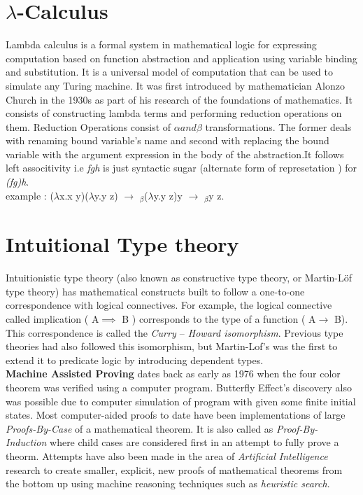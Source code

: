 \section{$\lambda$-Calculus}

Lambda calculus is a formal system in mathematical logic for expressing computation based on function abstraction and application using variable binding and substitution. It is a universal model of computation that can be used to simulate any Turing machine. It was first introduced by mathematician Alonzo Church in the 1930s as part of his research of the foundations of mathematics. It consists of constructing lambda terms and performing reduction operations on them. Reduction Operations consist of $\alpha and \beta $ transformations. The former deals with renaming bound variable's name and second with replacing the bound variable with the argument expression in the body of the abstraction.It follows left associtivity i.e \textit{fgh} is just syntactic sugar (alternate form of represetation ) for \textit{(fg)h}.\\

example : ($\lambda$x.x y)($\lambda$y.y z) $\longrightarrow$ {}$_\beta$($\lambda$y.y z)y $\longrightarrow$ {}$_\beta$y z.

\section{Intuitional Type theory} 

Intuitionistic type theory (also known as constructive type theory, or Martin-Löf type theory) has mathematical constructs  built to follow a one-to-one correspondence with logical connectives. For example, the logical connective called implication ( { A$\implies$ B} ) corresponds to the type of a function ( { A$\to$ B}). This correspondence is called the \textit{Curry $–$ Howard isomorphism}. Previous type theories had also followed this isomorphism, but Martin-Lof's was the first to extend it to predicate logic by introducing dependent types.\\

\hfill \break \textbf{Machine Assisted Proving} dates back as early as 1976 when the four color theorem was verified using a computer program. Butterfly Effect's discovery also was possible due to computer simulation of program with given some finite initial states. Most computer-aided proofs to date have been implementations of large \textit{Proofs-By-Case} of a mathematical theorem. It is also called as \textit{Proof-By-Induction}  where child cases are considered first in an attempt to fully prove a theorm. Attempts have also been made in the area of \textit{Artificial Intelligence} research to create smaller, explicit, new proofs of mathematical theorems from the bottom up using machine reasoning techniques such as \textit{heuristic search}.\\

